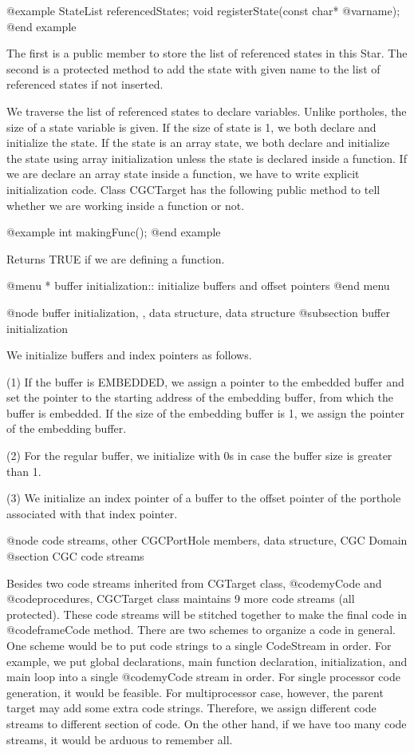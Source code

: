 {@example
StateList referencedStates;
void registerState(const char* @var{name});
@end example

The first is a public member to store the list of referenced states in this
Star. The second is a protected method to add the state with given name to
the list of referenced states if not inserted.

We traverse the list of referenced states to declare variables. Unlike
portholes, the size of a state variable is given. If the size of state is 1,
we both declare and initialize the state. If the state is an array state,
we both declare and initialize the state using array initialization unless
the state is declared inside a function. If we are declare an array state
inside a function, we have to write explicit initialization code.
Class CGCTarget has the following public method to tell whether we are
working inside a function or not.

@example
int makingFunc();
@end example

Returns TRUE if we are defining a function.

@menu
* buffer initialization::		initialize buffers and offset pointers
@end menu

@node buffer initialization, , data structure, data structure
@subsection buffer initialization

We initialize buffers and index pointers as follows.

(1) If the buffer is EMBEDDED, we assign a pointer to the embedded 
buffer and set the pointer
to the starting address of the embedding buffer, from which the buffer
is embedded. If the size of the embedding
buffer is 1, we assign the pointer of the embedding buffer.

(2) For the regular buffer, we initialize with 0s in case the buffer size is
greater than 1.

(3) We initialize an index pointer of a buffer to the offset pointer of
the porthole associated with that index pointer.

@node code streams, other CGCPortHole members, data structure, CGC Domain
@section CGC code streams

Besides two code streams inherited from CGTarget class, @code{myCode} and
@code{procedures}, CGCTarget class maintains 9 more code streams (all
protected). These
code streams will be stitched together to make the final code in
@code{frameCode} method. There are two schemes to organize a code in general.
One scheme would be to put code strings to a single CodeStream in order.
For example, we put global declarations, main function declaration, 
initialization, and main loop into a single @code{myCode} stream in order.
For single processor code generation, it would be feasible. For
multiprocessor case, however, the parent target may add some extra code
strings. Therefore, we assign different code streams to different
section of code. On the other hand, if we have too many code streams,
it would be arduous to remember all. 

}
